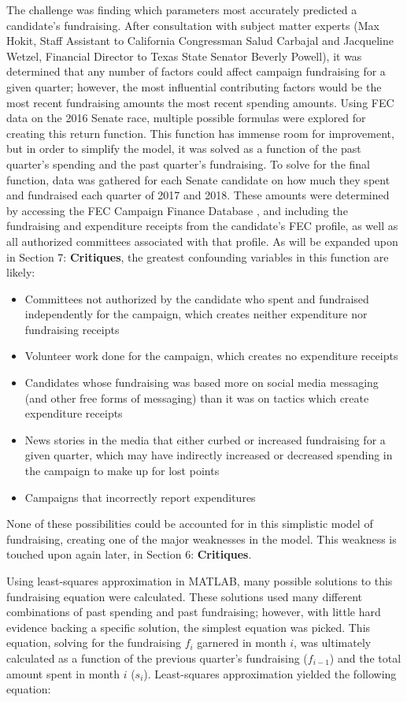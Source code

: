 \documentclass[11pt]{article}
\begin{document}
The challenge was finding which parameters most accurately predicted a
candidate's fundraising. After consultation with subject matter experts (Max Hokit, Staff Assistant to California Congressman Salud Carbajal\cite{max} and Jacqueline Wetzel, Financial Director to Texas State Senator Beverly Powell\cite{jackie}), it was determined that any number of factors could
affect campaign fundraising for a given quarter; however, the most influential
contributing factors would be the most recent fundraising amounts the most recent spending
amounts. Using FEC data on the 2016 Senate race, multiple possible formulas
were explored for creating this return function. This function has immense room
for improvement, but in order to simplify the model, it was solved as a
function of the past quarter's spending and the past quarter's fundraising. To
solve for the final function, data was gathered for each Senate candidate on
how much they spent and fundraised each quarter of 2017 and 2018. These amounts
were determined by accessing the FEC Campaign Finance Database \cite{fec}, and
including the fundraising and expenditure receipts from the candidate's FEC
profile, as well as all authorized committees associated with that profile. As
will be expanded upon in Section 7: \textbf{Critiques}, the greatest
confounding variables in this function are likely:
\begin{itemize}
\item Committees not authorized by the candidate who spent and fundraised
independently for the campaign, which creates neither expenditure nor
fundraising receipts
\item Volunteer work done for the campaign, which creates no expenditure
receipts
\item Candidates whose fundraising was based more on social media messaging
(and other free forms of messaging) than it was on tactics which create
expenditure receipts
\item News stories in the media that either curbed or increased fundraising for
a given quarter, which may have indirectly increased or decreased spending in
the campaign to make up for lost points
\item Campaigns that incorrectly report expenditures
\end{itemize}
None of these possibilities could be accounted for in this simplistic model of
fundraising, creating one of the major weaknesses in the model. This weakness
is touched upon again later, in Section 6: \textbf{Critiques}.

Using least-squares approximation in MATLAB, many possible solutions to this
fundraising equation were calculated. These solutions used many different
combinations of past spending and past fundraising; however, with little hard
evidence backing a specific solution, the simplest equation was picked. This
equation, solving for the fundraising $f_i$ garnered in month $i$, was
ultimately calculated as a function of the previous quarter's fundraising
($f_{i-1}$) and the total amount spent in month $i$ ($s_i$). Least-squares
approximation yielded the following equation:
\end{document}
